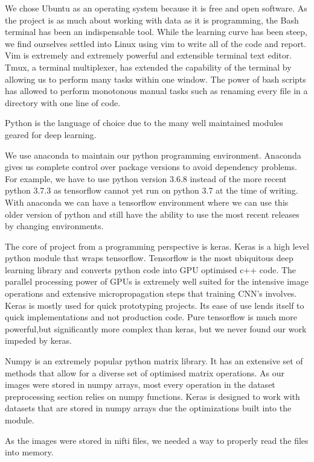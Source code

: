 \documentclass[12pt]{article}
\begin{document}
We chose Ubuntu as an operating system because it is free and open software.
As the project is as much about working with data as it is programming, the Bash terminal has been an indispensable tool.
While the learning curve has been steep, we find ourselves settled into Linux using vim to write all of the code and report.
Vim is extremely and extremely powerful and extensible terminal text editor.
Tmux, a terminal multiplexer, has extended the capability of the terminal by allowing us to perform many tasks within one window.
The power of bash scripts has allowed to perform monotonous manual tasks such as renaming every file in a directory with one line of code.
\par
Python is the language of choice due to the many well maintained modules geared for deep learning.
\par
We use anaconda to maintain our python programming environment.
Anaconda gives us complete control over package versions to avoid dependency problems.
For example, we have to use python version 3.6.8 instead of the more recent python 3.7.3 as tensorflow cannot yet run on python 3.7 at the time of writing.
With anaconda we can have a tensorflow environment where we can use this older version of python and still have the ability to use the most recent releases by changing environments.
\par
The core of project from a programming perspective is keras.
Keras is a high level python module that wraps tensorflow.
Tensorflow is the most ubiquitous deep learning library and converts python code into GPU optimised c++ code.
The parallel processing power of GPUs is extremely well suited for the intensive image operations and extensive micropropagation steps that training CNN's involves.
Keras is mostly used for quick prototyping projects.
Its ease of use lends itself to quick implementations and not production code.
Pure tensorflow is much more powerful,but significantly more complex than keras, but we never found our work impeded by keras.
\par
Numpy is an extremely popular python matrix library.
It has an extensive set of methods that allow for a diverse set of optimised matrix operations.
As our images were stored in numpy arrays, most every operation in the dataset preprocessing section relies on numpy functions.
Keras is designed to work with datasets that are stored in numpy arrays due the optimizations built into the module.
\par
As the images were stored in nifti files, we needed a way to properly read the files into memory.
\end{document}
